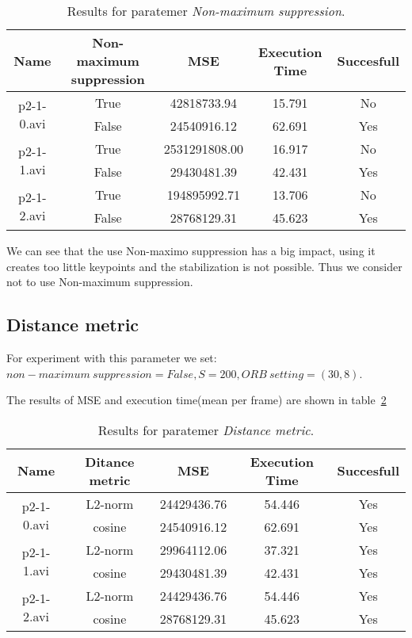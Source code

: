 \begin{table}[H]
\centering
\begin{tabular}{|c|c|c|c|c|}
\hline
\textbf{Name} & \textbf{Non-maximum suppression} & \textbf{MSE} & \textbf{Execution Time} & \textbf{Succesfull} \\ \hline
\multirow{2}{*}{p2-1-0.avi} & True & 42818733.94 & 15.791 & No \\ \cline{2-5} 
 & False & 24540916.12 & 62.691 & Yes \\ \hline
\multirow{2}{*}{p2-1-1.avi} & True & 2531291808.00 & 16.917 & No \\ \cline{2-5} 
 & False & 29430481.39 & 42.431 & Yes \\ \hline
\multirow{2}{*}{p2-1-2.avi} & True & 194895992.71 & 13.706 & No \\ \cline{2-5} 
 & False & 28768129.31 & 45.623 & Yes \\ \hline
\end{tabular}
\caption{Results for paratemer \textit{Non-maximum suppression}.}
\label{table:comparison-NMS}
\end{table}

We can see that the use Non-maximo suppression has a big impact, using it creates too little keypoints and the stabilization is not possible. Thus we consider not to use Non-maximum suppression.

\subsection{Distance metric}

For experiment with this parameter we set: $non-maximum~suppression=False, S=200, ORB~ setting = (30,8)$.

The results of MSE and execution time(mean per frame) are shown in table~\ref{table:comparison-DM}

\begin{table}[H]
\centering
\begin{tabular}{|c|c|c|c|c|}
\hline
\textbf{Name} & \textbf{Ditance metric} & \textbf{MSE} & \textbf{Execution Time} & \textbf{Succesfull} \\ \hline
\multirow{2}{*}{p2-1-0.avi} & L2-norm & 24429436.76 & 54.446 & Yes \\ \cline{2-5} 
 & cosine & 24540916.12 & 62.691 & Yes \\ \hline
\multirow{2}{*}{p2-1-1.avi} & L2-norm & 29964112.06 & 37.321 & Yes \\ \cline{2-5} 
 & cosine & 29430481.39 & 42.431 & Yes \\ \hline
\multirow{2}{*}{p2-1-2.avi} & L2-norm & 24429436.76 & 54.446 & Yes \\ \cline{2-5} 
 & cosine & 28768129.31 & 45.623 & Yes \\ \hline
\end{tabular}
\caption{Results for paratemer \textit{Distance metric}.}
\label{table:comparison-DM}
\end{table}

